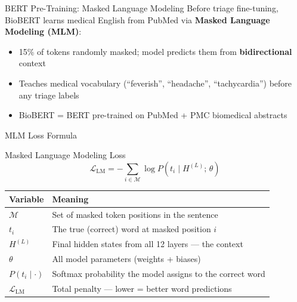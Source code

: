 \documentclass[10pt,aspectratio=169]{beamer}
\begin{document}
\begin{frame}{BERT Pre-Training: Masked Language Modeling}
	\small
	Before triage fine-tuning, BioBERT learns medical English from PubMed via \textbf{Masked Language Modeling (MLM)}:
	\begin{center}
	\end{center}
	\begin{itemize}
		\item 15\% of tokens randomly masked; model predicts them from \textbf{bidirectional} context
		\item Teaches medical vocabulary (``feverish'', ``headache'', ``tachycardia'') before any triage labels
		\item BioBERT = BERT pre-trained on PubMed + PMC biomedical abstracts
	\end{itemize}
\end{frame}

\begin{frame}{MLM Loss Formula}
	\small
	\begin{block}{Masked Language Modeling Loss}
		\[
			\mathcal{L}_{\mathrm{LM}} = -\sum_{i \in \mathcal{M}} \log P(t_i \mid H^{(L)};\, \theta)
		\]
	\end{block}
	\begin{tabular}{@{}p{2.5cm}p{8.5cm}@{}}
		\toprule
		\textbf{Variable} & \textbf{Meaning} \\
		\midrule
		$\mathcal{M}$ & Set of masked token positions in the sentence \\
		$t_i$ & The true (correct) word at masked position $i$ \\
		$H^{(L)}$ & Final hidden states from all 12 layers --- the context \\
		$\theta$ & All model parameters (weights + biases) \\
		$P(t_i \mid \cdot)$ & Softmax probability the model assigns to the correct word \\
		$\mathcal{L}_{\mathrm{LM}}$ & Total penalty --- lower = better word predictions \\
		\bottomrule
	\end{tabular}
\end{frame}
\end{document}
